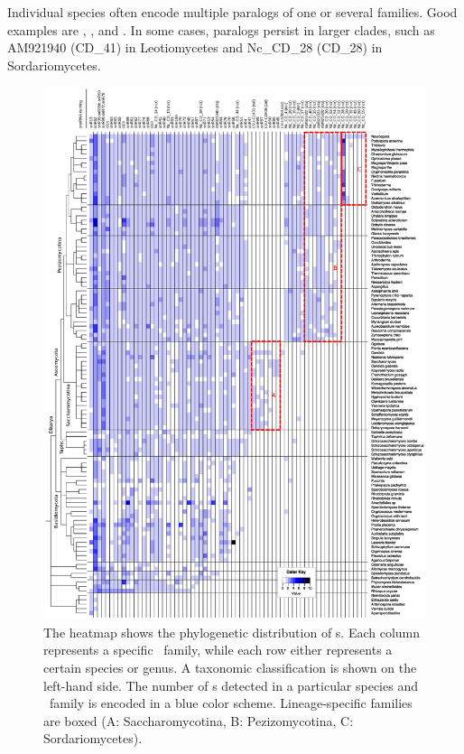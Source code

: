 Individual species often encode multiple paralogs of one or several
families. Good examples are \Ppl, \Asp, and \Nfu. In some cases, paralogs
persist in larger clades, such as AM921940 (CD\_41) in Leotiomycetes and
Nc\_CD\_28 (CD\_28) in Sordariomycetes.

\begin{figure}
  \vspace{-1cm}
  \centering
  \includegraphics[width=1.05\textwidth]{pics/CD_snoRNAs_collapsed.short_naming.rotated.eps}
  \caption{The heatmap shows the phylogenetic distribution of \cd s. 
    Each column represents a specific \sno\ family,
    while each row either represents a certain species or genus. A
    taxonomic classification is shown on the left-hand side. The
    number of \sno s detected in a particular species and \sno\ family
    is encoded in a blue color scheme. Lineage-specific families are
    boxed (A: Saccharomycotina, B: Pezizomycotina, C:
    Sordariomycetes).}
  \label{fig:heatmap_CD_snoRNAs} 
\end{figure}

